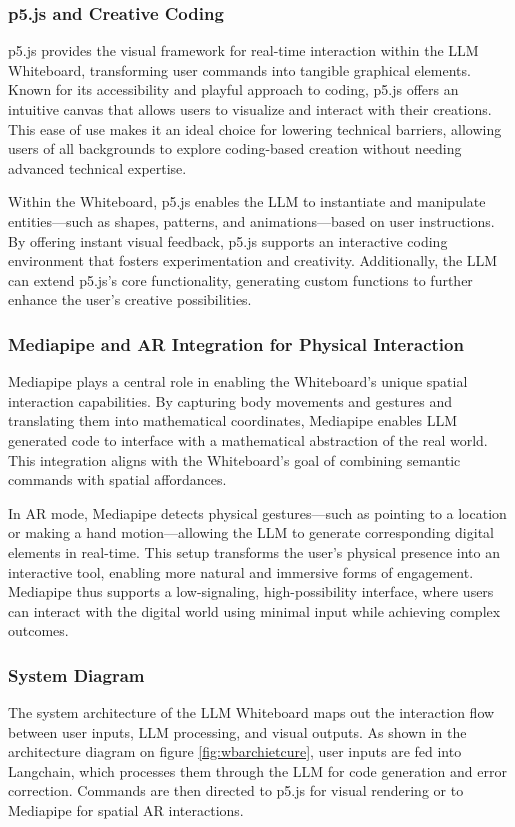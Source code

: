\subsubsection{p5.js and Creative Coding}
p5.js provides the visual framework for real-time interaction within the LLM Whiteboard, transforming user commands into tangible graphical elements.
Known for its accessibility and playful approach to coding, p5.js offers an intuitive canvas that allows users to visualize and interact with their creations.
This ease of use makes it an ideal choice for lowering technical barriers, allowing users of all backgrounds to explore coding-based creation without needing advanced technical expertise.

Within the Whiteboard, p5.js enables the LLM to instantiate and manipulate entities—such as shapes, patterns, and animations—based on user instructions.
By offering instant visual feedback, p5.js supports an interactive coding environment that fosters experimentation and creativity.
Additionally, the LLM can extend p5.js’s core functionality, generating custom functions to further enhance the user’s creative possibilities.

\subsubsection{Mediapipe and AR Integration for Physical Interaction}
Mediapipe plays a central role in enabling the Whiteboard’s unique spatial interaction capabilities.
By capturing body movements and gestures and translating them into mathematical coordinates, Mediapipe enables LLM generated code to interface with a mathematical abstraction of the real world.
This integration aligns with the Whiteboard’s goal of combining semantic commands with spatial affordances.

In AR mode, Mediapipe detects physical gestures—such as pointing to a location or making a hand motion—allowing the LLM to generate corresponding digital elements in real-time.
This setup transforms the user’s physical presence into an interactive tool, enabling more natural and immersive forms of engagement.
Mediapipe thus supports a low-signaling, high-possibility interface, where users can interact with the digital world using minimal input while achieving complex outcomes.

\subsubsection{System Diagram}
The system architecture of the LLM Whiteboard maps out the interaction flow between user inputs, LLM processing, and visual outputs.
As shown in the architecture diagram on figure \ref{fig:wbarchietcure}, user inputs are fed into Langchain, which processes them through the LLM for code generation and error correction.
Commands are then directed to p5.js for visual rendering or to Mediapipe for spatial AR interactions.

